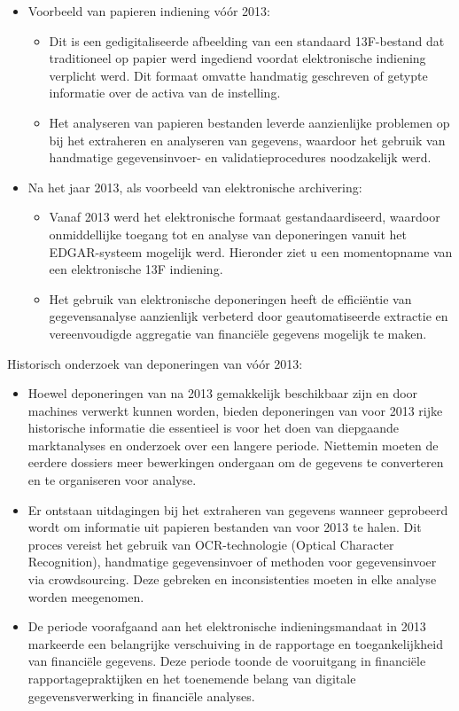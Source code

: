 \begin{itemize}
  \item Voorbeeld van papieren indiening vóór 2013:
  \begin{itemize}
    \item Dit is een gedigitaliseerde afbeelding van een standaard 13F-bestand dat traditioneel op papier werd ingediend voordat elektronische indiening verplicht werd. Dit formaat omvatte handmatig geschreven of getypte informatie over de activa van de instelling.
    \item Het analyseren van papieren bestanden leverde aanzienlijke problemen op bij het extraheren en analyseren van gegevens, waardoor het gebruik van handmatige gegevensinvoer- en validatieprocedures noodzakelijk werd.
  \end{itemize}
  \item Na het jaar 2013, als voorbeeld van elektronische archivering:

  \begin{itemize}
    \item Vanaf 2013 werd het elektronische formaat gestandaardiseerd, waardoor onmiddellijke toegang tot en analyse van deponeringen vanuit het EDGAR-systeem mogelijk werd. Hieronder ziet u een momentopname van een elektronische 13F indiening.
    \item Het gebruik van elektronische deponeringen heeft de efficiëntie van gegevensanalyse aanzienlijk verbeterd door geautomatiseerde extractie en vereenvoudigde aggregatie van financiële gegevens mogelijk te maken.
  \end{itemize}

\end{itemize}



Historisch onderzoek van deponeringen van vóór 2013: 
\begin{itemize}
  \item Hoewel deponeringen van na 2013 gemakkelijk beschikbaar zijn en door machines verwerkt kunnen worden, bieden deponeringen van voor 2013 rijke historische informatie die essentieel is voor het doen van diepgaande marktanalyses en onderzoek over een langere periode. Niettemin moeten de eerdere dossiers meer bewerkingen ondergaan om de gegevens te converteren en te organiseren voor analyse.
  \item Er ontstaan uitdagingen bij het extraheren van gegevens wanneer geprobeerd wordt om informatie uit papieren bestanden van voor 2013 te halen. Dit proces vereist het gebruik van OCR-technologie (Optical Character Recognition), handmatige gegevensinvoer of methoden voor gegevensinvoer via crowdsourcing. Deze gebreken en inconsistenties moeten in elke analyse worden meegenomen.

  \item De periode voorafgaand aan het elektronische indieningsmandaat in 2013 markeerde een belangrijke verschuiving in de rapportage en toegankelijkheid van financiële gegevens. Deze periode toonde de vooruitgang in financiële rapportagepraktijken en het toenemende belang van digitale gegevensverwerking in financiële analyses.

\end{itemize}

